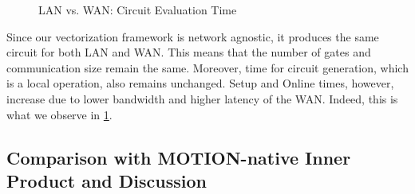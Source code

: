 \begin{figure}[htbp]
\centering
\resizebox{0.7\columnwidth}{!}{}
\caption{LAN vs. WAN: Circuit Evaluation Time}
\label{fig:graph_comparison_eval_time}
\end{figure}

Since our vectorization framework is network agnostic, it produces the same circuit for both LAN and WAN. This means that the number of gates and communication size remain the same. Moreover, time for circuit generation, which is a local operation, also remains unchanged. Setup and Online times, however, increase due to lower bandwidth and higher latency of the WAN. Indeed, this is what we observe in \cref{fig:graph_comparison_eval_time}.

\begin{comment}
\begin{figure*}[htbp]
\centering
\resizebox{0.7\textwidth}{!}{}
\caption{Communication Size of Benchmarks}
\label{fig:graph_comm_size}
\end{figure*}


\begin{figure*}[htbp]
\centering
\resizebox{0.7\textwidth}{!}{}
\caption{Circuit Generation Time of Benchmarks}
\label{fig:graph_circ_gen_time}
\end{figure*}

\begin{figure*}[htbp]
\centering
\resizebox{0.7\textwidth}{!}{}
\caption{Number of Gates of Benchmarks}
\label{fig:graph_total_gates}
\end{figure*}

\begin{figure*}[htbp]
\centering
\resizebox{0.7\textwidth}{!}{}
\caption{Online Time of Benchmarks}
\label{fig:graph_online_time}
\end{figure*}

\begin{figure*}[htbp]
\centering
\resizebox{0.7\textwidth}{!}{}
\caption{Setup Time of Benchmarks}
\label{fig:graph_setup_time}
\end{figure*}
\end{comment}

\subsection{Comparison with MOTION-native Inner Product and Discussion}

